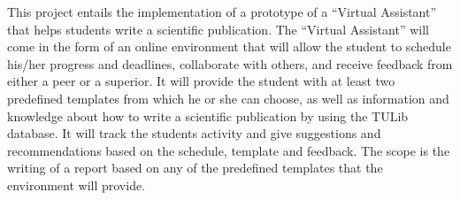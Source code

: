 This project entails the implementation of a prototype of a ``Virtual Assistant'' that helps students write a scientific publication.
The ``Virtual Assistant'' will come in the form of an online environment that will allow the student to schedule his/her progress 
and deadlines, collaborate with others, and receive feedback from either a peer or a superior. 
It will provide the student with at least two predefined templates from which he or she can choose, as well as information and knowledge
about how to write a scientific publication by using the TULib database. It will track the students activity
and give suggestions and recommendations based on the schedule, template and feedback.
The scope is the writing of a report based on any of the predefined templates that 
the environment will provide.